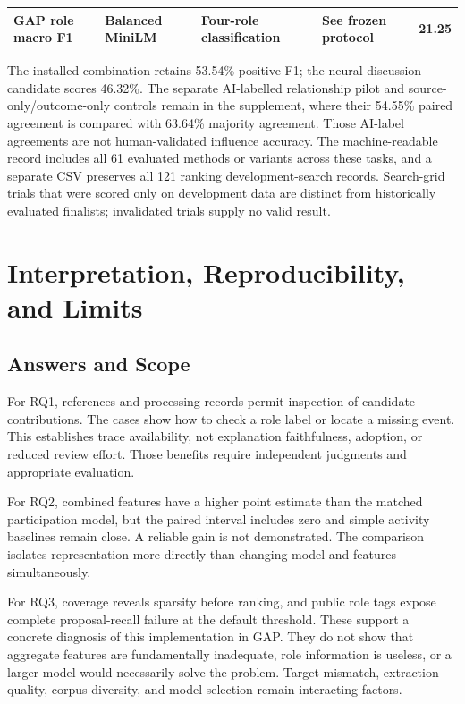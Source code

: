 \documentclass[journal]{IEEEtran}
\begin{document}
\begin{table}[t]
\begin{tabular}{p{}p{}p{}p{}p{}}
{\raggedright GAP role macro F1\par} & {\raggedright Balanced MiniLM\par} & {\raggedright Four-role classification\par} & {\raggedright See frozen protocol\par} & {\raggedright 21.25\par} \\
\bottomrule
\end{tabular}
\end{table}
The installed combination retains 53.54\% positive F1; the neural discussion candidate scores 46.32\%. The separate AI-labelled relationship pilot and source-only/outcome-only controls remain in the supplement, where their 54.55\% paired agreement is compared with 63.64\% majority agreement. Those AI-label agreements are not human-validated influence accuracy. The machine-readable record includes all 61 evaluated methods or variants across these tasks, and a separate CSV preserves all 121 ranking development-search records. Search-grid trials that were scored only on development data are distinct from historically evaluated finalists; invalidated trials supply no valid result.

\clearpage
\section{Interpretation, Reproducibility, and Limits}
\subsection{Answers and Scope}
For RQ1, references and processing records permit inspection of candidate contributions. The cases show how to check a role label or locate a missing event. This establishes trace availability, not explanation faithfulness, adoption, or reduced review effort. Those benefits require independent judgments and appropriate evaluation.

For RQ2, combined features have a higher point estimate than the matched participation model, but the paired interval includes zero and simple activity baselines remain close. A reliable gain is not demonstrated. The comparison isolates representation more directly than changing model and features simultaneously.

For RQ3, coverage reveals sparsity before ranking, and public role tags expose complete proposal-recall failure at the default threshold. These support a concrete diagnosis of this implementation in GAP. They do not show that aggregate features are fundamentally inadequate, role information is useless, or a larger model would necessarily solve the problem. Target mismatch, extraction quality, corpus diversity, and model selection remain interacting factors.
\end{document}

